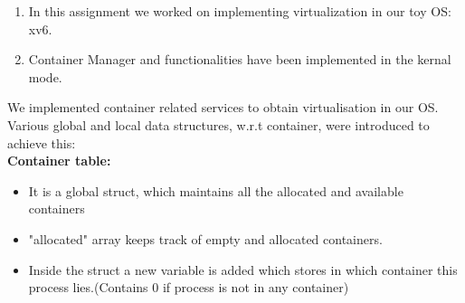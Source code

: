 
    \begin{enumerate}
        \item In this assignment we worked on implementing virtualization in  our toy OS: xv6.
        \item Container Manager and functionalities have been implemented in the kernal mode.
    \end{enumerate}
    We implemented container related services to obtain virtualisation in our OS. Various global and local data structures, w.r.t container, were introduced to achieve this: \\
    
\hspace*{-1cm} \textbf{Container table:}

\begin{itemize}
    \item It is a global struct, which maintains all the allocated and available containers
    \item "allocated" array keeps track of empty and allocated containers.
\end{itemize}


\begin{itemize}
    \item Inside the  struct a new variable  is added which stores in which container this process lies.(Contains $0$ if process is not in any container)
\end{itemize}
